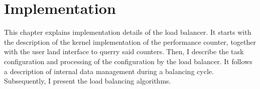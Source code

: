 \chapter{Implementation}
\label{sec:implementation}


This chapter explains implementation details of the load balancer.
It starts with the description of the kernel implementation of the performance
counter, together with the user land interface to querry said counters.
Then, I describe the task configuration and processing of the configuration by
the load balancer.
It follows a description of internal data management during a balancing cycle.
Subsequently, I present the load balancing algorithms.







\cleardoublepage

